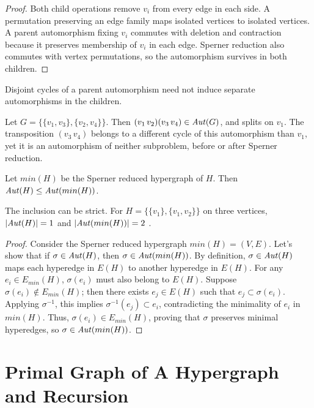\begin{proof}
Both child operations remove $v_i$ from every edge in each side. A permutation preserving an edge family maps isolated vertices to isolated vertices. A parent automorphism fixing $v_i$ commutes with deletion and contraction because it preserves membership of $v_i$ in each edge. Sperner reduction also commutes with vertex permutations, so the automorphism survives in both children.
\end{proof}

Disjoint cycles of a parent automorphism need not induce separate automorphisms in the children.

\begin{example}
Let $G=\{\{v_1,v_3\},\{v_2,v_4\}\}$. Then $(v_1\,v_2)(v_3\,v_4)\in\mathit{Aut}(G)$, and \FKA{} splits on $v_1$. The transposition $(v_3\,v_4)$ belongs to a different cycle of this automorphism than $v_1$, yet it is an automorphism of neither subproblem, before or after Sperner reduction.
\end{example}


\begin{corollary}\label{cor:aut-min}
Let $min(H)$ be the Sperner reduced hypergraph of $H$. Then $\mathit{Aut}(H)\le\mathit{Aut}(min(H))$.
\end{corollary}

The inclusion can be strict. For $H=\{\{v_1\},\{v_1,v_2\}\}$ on three vertices, $|\mathit{Aut}(H)|=1$ and $|\mathit{Aut}(min(H))|=2$ .

\begin{proof}
Consider the Sperner reduced hypergraph $min(H)=(V,E)$. Let's show that if $\sigma\in\mathit{Aut}(H)$, then $\sigma\in\mathit{Aut}(min(H))$. By definition, $\sigma\in\mathit{Aut}(H)$ maps each hyperedge in $E(H)$ to another hyperedge in $E(H)$. For any $e_i\in E_{min}(H)$, $\sigma(e_i)$ must also belong to $E(H)$. Suppose $\sigma(e_i)\notin E_{min}(H)$; then there exists $e_j\in E(H)$ such that $e_j\subset\sigma(e_i)$. Applying $\sigma^{-1}$, this implies $\sigma^{-1}(e_j)\subset e_i$, contradicting the minimality of $e_i$ in $min(H)$. Thus, $\sigma(e_i)\in E_{min}(H)$, proving that $\sigma$ preserves minimal hyperedges, so $\sigma\in\mathit{Aut}(min(H))$.

\end{proof}

\section{Primal Graph of A Hypergraph and \FKA{} Recursion}

